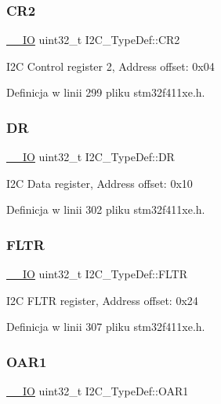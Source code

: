 \subsubsection{\texorpdfstring{C\+R2}{CR2}}
{\footnotesize\ttfamily \hyperlink{core__sc300_8h_aec43007d9998a0a0e01faede4133d6be}{\+\_\+\+\_\+\+IO} uint32\+\_\+t I2\+C\+\_\+\+Type\+Def\+::\+C\+R2}

I2C Control register 2, Address offset\+: 0x04 

Definicja w linii 299 pliku stm32f411xe.\+h.

\mbox{\label{struct_i2_c___type_def_a5c1beaa4935359da1c8f0ceb287f90be}} 
\subsubsection{\texorpdfstring{DR}{DR}}
{\footnotesize\ttfamily \hyperlink{core__sc300_8h_aec43007d9998a0a0e01faede4133d6be}{\+\_\+\+\_\+\+IO} uint32\+\_\+t I2\+C\+\_\+\+Type\+Def\+::\+DR}

I2C Data register, Address offset\+: 0x10 

Definicja w linii 302 pliku stm32f411xe.\+h.

\mbox{\label{struct_i2_c___type_def_a6b540b18ea0370e3e45f69902343320c}} 
\subsubsection{\texorpdfstring{F\+L\+TR}{FLTR}}
{\footnotesize\ttfamily \hyperlink{core__sc300_8h_aec43007d9998a0a0e01faede4133d6be}{\+\_\+\+\_\+\+IO} uint32\+\_\+t I2\+C\+\_\+\+Type\+Def\+::\+F\+L\+TR}

I2C F\+L\+TR register, Address offset\+: 0x24 

Definicja w linii 307 pliku stm32f411xe.\+h.

\mbox{\label{struct_i2_c___type_def_ae8269169fcbdc2ecb580208d99c2f89f}} 
\subsubsection{\texorpdfstring{O\+A\+R1}{OAR1}}
{\footnotesize\ttfamily \hyperlink{core__sc300_8h_aec43007d9998a0a0e01faede4133d6be}{\+\_\+\+\_\+\+IO} uint32\+\_\+t I2\+C\+\_\+\+Type\+Def\+::\+O\+A\+R1}

